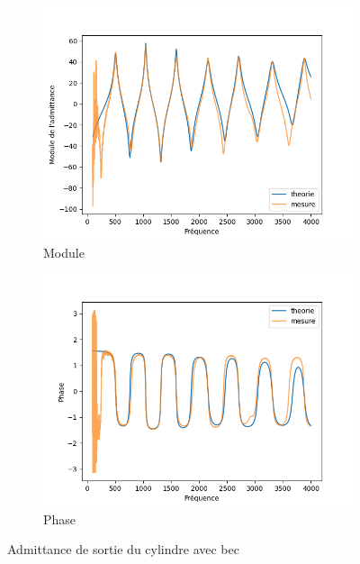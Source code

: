 \documentclass[atiam, article]{rapport} %
\begin{document}
\begin{figure}[H]
  \centering
  \begin{subfigure}[b]{.45\textwidth}
    \centering
    \includegraphics[width=\textwidth]{vents/images_vents/admittance_cylindre+bec_amp.png}
    \caption{Module}
    \label{subfig:admittance_cylindre+bec_amp}
  \end{subfigure}
  \begin{subfigure}[b]{.45\textwidth}
    \centering
    \includegraphics[width=\textwidth]{vents/images_vents/admittance_cylindre+bec_phase.png}
    \caption{Phase}
    \label{subfig:admittance_cylindre+bec_phase}
  \end{subfigure}
  \caption{Admittance de sortie du cylindre avec bec}
  \label{fig:admittance_cyl_bec}
\end{figure}
\end{document}
